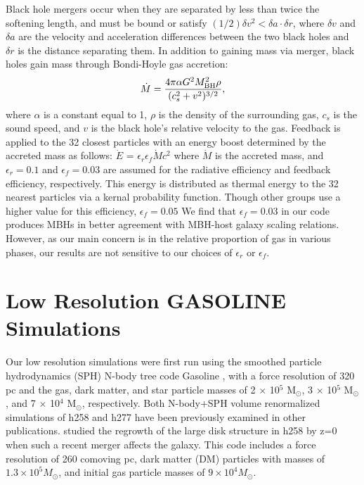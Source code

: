 \documentclass[12pt,headA,chapB]{fiskthesis}
\begin{document}
Black hole mergers occur when they are separated by less than twice the softening length, and must be bound or satisfy $(1/2) \delta v^2 < \delta a \cdot \delta r$,  where $\delta v$ and $\delta a$ are the velocity and acceleration differences between the two black holes and $\delta r$ is the distance separating them. In addition to gaining mass via merger, black holes gain mass through Bondi-Hoyle gas accretion:
\begin{equation}
\dot{M} = \frac{4 \pi \alpha G^2 M^{2}_{\rm BH} \rho}{(c^{2}_{s} + v^2)^{3/2}},
\end{equation}
where $\alpha$ is a constant equal to 1, $\rho$ is the density of the surrounding gas, $c_s$ is the sound speed, and $v$ is the black hole's relative velocity to the gas. Feedback is applied to the 32 closest particles with an energy boost determined by the accreted mass as follows: $\dot{E}$ = $\epsilon _{r}$$\epsilon_{f}$$\dot{M}$$c^2$ where $\dot{M}$ is the accreted mass, and $\epsilon _r = 0.1$ and $\epsilon _f = 0.03$ are assumed for the radiative efficiency and feedback efficiency, respectively. This energy is distributed as thermal energy to the 32 nearest particles via a kernal probability function. Though other groups use a higher value for this efficiency, $\epsilon _f = 0.05$ \citep{Sijacki2007,DiMatteo2008} We find that $\epsilon_f = 0.03$ in our code produces MBHs in better agreement with MBH-host galaxy scaling relations. However, as our main concern is in the relative proportion of gas in various phases, our results are not sensitive to our choices of $\epsilon _{r}$ or $\epsilon_{f}$.
 
\section{\normalsize Low Resolution GASOLINE Simulations}

Our low resolution simulations were first run using the smoothed particle hydrodynamics (SPH) N-body tree code Gasoline \citep{Wadsley2004}, with a force resolution of 320 pc and the gas, dark matter, and star particle masses of 2 $\times$ 10$^5$ M$_{\odot}$, 3 $\times$ 10$^5$ M$_{\odot}$, and 7 $\times$ 10$^4$ M$_{\odot}$, respectively. Both N-body+SPH volume renormalized simulations of h258 and h277 have been previously examined in other publications. \cite{Governato2009} studied the regrowth of the large disk structure in h258 by z=0 when such a recent merger affects the galaxy. This code includes a force resolution of 260 comoving pc, dark matter (DM) particles with masses of $1.3 \times 10^5 M_{\odot}$, and initial gas particle masses of $9 \times 10^4 M_{\odot}$.  
	
\end{document}
